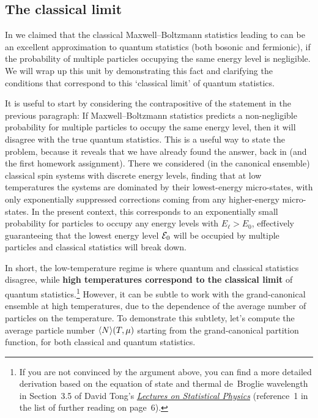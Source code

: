 \subsection{\label{sec:quantum_classical}The classical limit}
In  we claimed that the classical Maxwell--Boltzmann statistics leading to  can be an excellent approximation to quantum statistics (both bosonic and fermionic), if the probability of multiple particles occupying the same energy level is negligible.
We will wrap up this unit by demonstrating this fact and clarifying the conditions that correspond to this `classical limit' of quantum statistics.

It is useful to start by considering the contrapositive of the statement in the previous paragraph:
If Maxwell--Boltzmann statistics predicts a non-negligible probability for multiple particles to occupy the same energy level, then it will disagree with the true quantum statistics.
This is a useful way to state the problem, because it reveals that we have already found the answer, back in  (and the first homework assignment).
There we considered (in the canonical ensemble) classical spin systems with discrete energy levels, finding that at low temperatures the systems are dominated by their lowest-energy micro-states, with only exponentially suppressed corrections coming from any higher-energy micro-states.
In the present context, this corresponds to an exponentially small probability for particles to occupy any energy levels with $E_{\ell} > E_0$, effectively guaranteeing that the lowest energy level $\mathcal E_0$ will be occupied by multiple particles and classical statistics will break down. %

In short, the low-temperature regime is where quantum and classical statistics disagree, while \textbf{high temperatures correspond to the classical limit} of quantum statistics.\footnote{If you are not convinced by the argument above, you can find a more detailed derivation based on the equation of state and thermal de~Broglie wavelength in Section~3.5 of David Tong's \href{https://www.damtp.cam.ac.uk/user/tong/statphys.html}{\textit{Lectures on Statistical Physics}} (reference~1 in the list of further reading on page~6).}
However, it can be subtle to work with the grand-canonical ensemble at high temperatures, due to the dependence of the average number of particles on the temperature.
To demonstrate this subtlety, let's compute the average particle number $\left\langle N \right\rangle\!(T, \mu)$ starting from the grand-canonical partition function, for both classical and quantum statistics.

